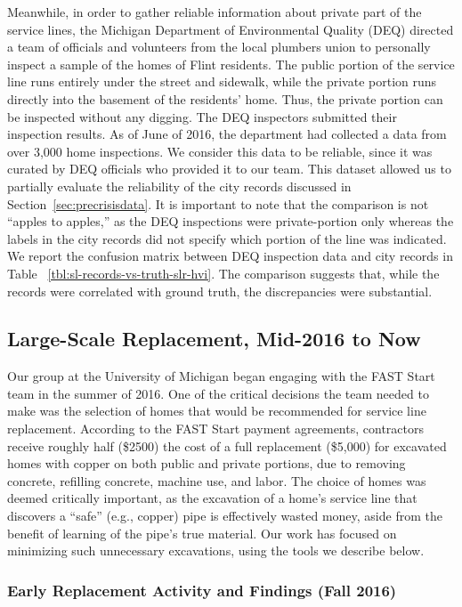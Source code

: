 \documentclass[sigconf]{acmart}
\begin{document}
Meanwhile, in order to gather reliable information about private part of the service lines, the Michigan Department of Environmental Quality (DEQ) directed a team of officials and volunteers from the local plumbers union to personally inspect a sample of the homes of Flint residents. The public portion of the service line runs entirely under the street and sidewalk, while the private portion runs directly into the basement of the residents' home. Thus, the private portion can be inspected without any digging. The DEQ inspectors submitted their inspection results. As of June of 2016, the department had collected a data from over 3,000 home inspections.  We consider this data to be reliable, since it was curated by DEQ officials who provided it to our team. This dataset allowed us to partially evaluate the reliability of the city records discussed in Section~\ref{sec:precrisisdata}. It is important to note that the comparison is not ``apples to apples,'' as the DEQ inspections were private-portion only whereas the labels in the city records did not specify which portion of the line was indicated. We report the confusion matrix between DEQ inspection data and city records in Table ~\ref{tbl:sl-records-vs-truth-slr-hvi}. The comparison suggests that, while the records were correlated with ground truth, the discrepancies were substantial.


\subsection{Large-Scale Replacement, Mid-2016 to Now}

Our group at the University of Michigan began engaging with the FAST Start team in the summer of 2016. One of the critical decisions the team needed to make was the selection of homes that would be recommended for service line replacement. According to the FAST Start payment agreements, contractors receive roughly half (\$2500) the cost of a full replacement (\$5,000) for excavated homes with copper on both public and private portions, due to removing concrete, refilling concrete, machine use, and labor. The choice of homes was deemed critically important, as the excavation of a home's service line that discovers a ``safe'' (e.g., copper) pipe is effectively wasted money, aside from the benefit of learning of the pipe's true material. Our work has focused on minimizing such unnecessary excavations, using the tools we describe below. 


\subsubsection{Early Replacement Activity and Findings (Fall 2016)}
\label{sub:replacement_phase_1_and_early_results}
\end{document}

